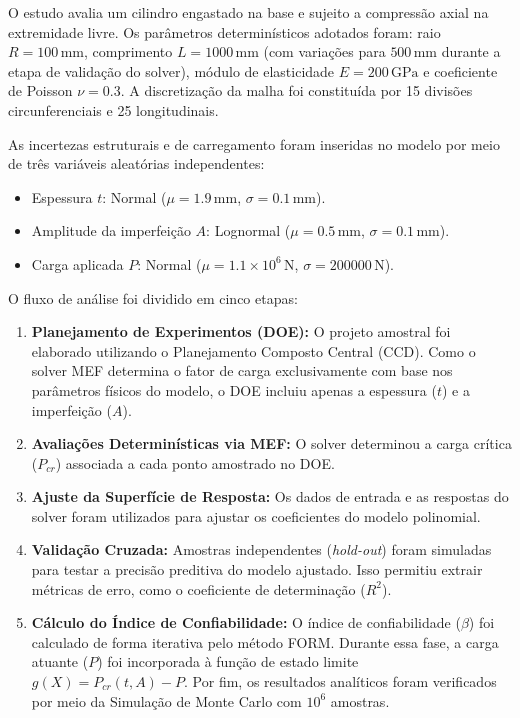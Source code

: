 \documentclass[12pt,a4paper]{article}
\begin{document}
O estudo avalia um cilindro engastado na base e sujeito a compressão axial na extremidade livre. Os parâmetros determinísticos adotados foram: raio $R = 100\,\text{mm}$, comprimento $L = 1000\,\text{mm}$ (com variações para $500\,\text{mm}$ durante a etapa de validação do solver), módulo de elasticidade $E = 200\,\text{GPa}$ e coeficiente de Poisson $\nu = 0.3$. A discretização da malha foi constituída por 15 divisões circunferenciais e 25 longitudinais.

As incertezas estruturais e de carregamento foram inseridas no modelo por meio de três variáveis aleatórias independentes:
\begin{itemize}
    \item Espessura $t$: Normal ($\mu = 1.9\,\text{mm}$, $\sigma = 0.1\,\text{mm}$).
    \item Amplitude da imperfeição $A$: Lognormal ($\mu = 0.5\,\text{mm}$, $\sigma = 0.1\,\text{mm}$).
    \item Carga aplicada $P$: Normal ($\mu = 1.1 \times 10^6\,\text{N}$, $\sigma = 200000\,\text{N}$).
\end{itemize}

O fluxo de análise foi dividido em cinco etapas:
\begin{enumerate}
    \item \textbf{Planejamento de Experimentos (DOE):} O projeto amostral foi elaborado utilizando o Planejamento Composto Central (CCD). Como o solver MEF determina o fator de carga exclusivamente com base nos parâmetros físicos do modelo, o DOE incluiu apenas a espessura ($t$) e a imperfeição ($A$).
    \item \textbf{Avaliações Determinísticas via MEF:} O solver determinou a carga crítica ($P_{cr}$) associada a cada ponto amostrado no DOE.
    \item \textbf{Ajuste da Superfície de Resposta:} Os dados de entrada e as respostas do solver foram utilizados para ajustar os coeficientes do modelo polinomial.
    \item \textbf{Validação Cruzada:} Amostras independentes (\textit{hold-out}) foram simuladas para testar a precisão preditiva do modelo ajustado. Isso permitiu extrair métricas de erro, como o coeficiente de determinação ($R^2$).
    \item \textbf{Cálculo do Índice de Confiabilidade:} O índice de confiabilidade ($\beta$) foi calculado de forma iterativa pelo método FORM. Durante essa fase, a carga atuante ($P$) foi incorporada à função de estado limite $g(X) = P_{cr}(t, A) - P$. Por fim, os resultados analíticos foram verificados por meio da Simulação de Monte Carlo com $10^6$ amostras.
\end{enumerate}
\end{document}
